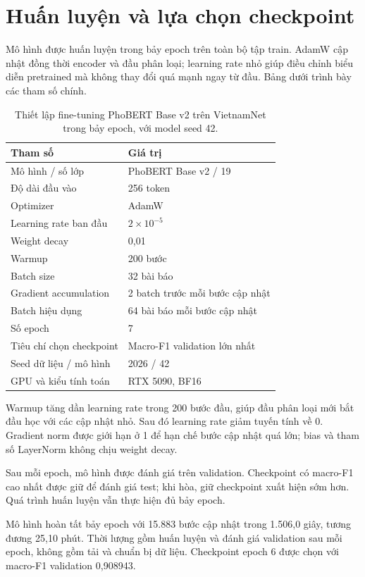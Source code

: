 \section{Huấn luyện và lựa chọn checkpoint}
Mô hình được huấn luyện trong bảy epoch trên toàn bộ tập train. AdamW cập nhật đồng thời encoder và đầu phân loại; learning rate nhỏ giúp điều chỉnh biểu diễn pretrained mà không thay đổi quá mạnh ngay từ đầu. Bảng dưới trình bày các tham số chính.
\begin{table}[htbp]\centering
\begin{tabularx}{\textwidth}{Xl}\toprule
Tham số & Giá trị\\\midrule
Mô hình / số lớp & PhoBERT Base v2 / 19\\
Độ dài đầu vào & 256 token\\
Optimizer & AdamW\\
Learning rate ban đầu & $2\times10^{-5}$\\
Weight decay & 0,01\\
Warmup & 200 bước\\
Batch size & 32 bài báo\\
Gradient accumulation & 2 batch trước mỗi bước cập nhật\\
Batch hiệu dụng & 64 bài báo mỗi bước cập nhật\\
Số epoch & 7\\
Tiêu chí chọn checkpoint & Macro-F1 validation lớn nhất\\
Seed dữ liệu / mô hình & 2026 / 42\\
GPU và kiểu tính toán & RTX 5090, BF16\\\bottomrule
\end{tabularx}
\caption{Thiết lập fine-tuning PhoBERT Base v2 trên VietnamNet trong bảy epoch, với model seed 42.}
\end{table}

Warmup tăng dần learning rate trong 200 bước đầu, giúp đầu phân loại mới bắt đầu học với các cập nhật nhỏ. Sau đó learning rate giảm tuyến tính về 0. Gradient norm được giới hạn ở 1 để hạn chế bước cập nhật quá lớn; bias và tham số LayerNorm không chịu weight decay.

Sau mỗi epoch, mô hình được đánh giá trên validation. Checkpoint có macro-F1 cao nhất được giữ để đánh giá test; khi hòa, giữ checkpoint xuất hiện sớm hơn. Quá trình huấn luyện vẫn thực hiện đủ bảy epoch.

Mô hình hoàn tất bảy epoch với 15.883 bước cập nhật trong 1.506,0 giây, tương đương 25,10 phút. Thời lượng gồm huấn luyện và đánh giá validation sau mỗi epoch, không gồm tải và chuẩn bị dữ liệu. Checkpoint epoch 6 được chọn với macro-F1 validation 0,908943.

